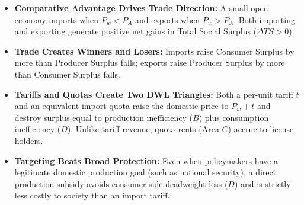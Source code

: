 \documentclass[11pt,letterpaper]{article}
\begin{document}
\begin{takeaways}
\begin{itemize}
    \item \textbf{Comparative Advantage Drives Trade Direction:} A small open economy imports when $P_w < P_A$ and exports when $P_w > P_A$. Both importing and exporting generate positive net gains in Total Social Surplus ($\Delta TS > 0$).
    \item \textbf{Trade Creates Winners and Losers:} Imports raise Consumer Surplus by more than Producer Surplus falls; exports raise Producer Surplus by more than Consumer Surplus falls.
    \item \textbf{Tariffs and Quotas Create Two DWL Triangles:} Both a per-unit tariff $t$ and an equivalent import quota raise the domestic price to $P_w + t$ and destroy surplus equal to production inefficiency ($B$) plus consumption inefficiency ($D$). Unlike tariff revenue, quota rents (Area $C$) accrue to license holders.
    \item \textbf{Targeting Beats Broad Protection:} Even when policymakers have a legitimate domestic production goal (such as national security), a direct production subsidy avoids consumer-side deadweight loss ($D$) and is strictly less costly to society than an import tariff.
\end{itemize}
\end{takeaways}
\end{document}
